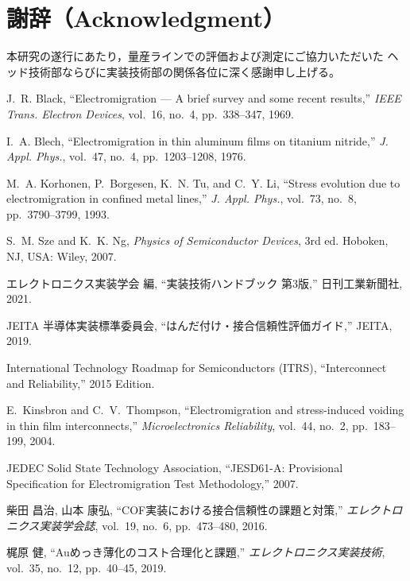 \documentclass[conference]{IEEEtran}
\begin{document}
\section*{謝辞（Acknowledgment）}
本研究の遂行にあたり，量産ラインでの評価および測定にご協力いただいた
ヘッド技術部ならびに実装技術部の関係各位に深く感謝申し上げる。

\balance

\begin{thebibliography}{99}

J.~R. Black, ``Electromigration --- A brief survey and some recent results,''
\emph{IEEE Trans. Electron Devices}, vol.~16, no.~4, pp.~338--347, 1969.

I.~A. Blech, ``Electromigration in thin aluminum films on titanium nitride,''
\emph{J. Appl. Phys.}, vol.~47, no.~4, pp.~1203--1208, 1976.

M.~A. Korhonen, P.~Borgesen, K.~N. Tu, and C.~Y. Li,
``Stress evolution due to electromigration in confined metal lines,''
\emph{J. Appl. Phys.}, vol.~73, no.~8, pp.~3790--3799, 1993.

S.~M. Sze and K.~K. Ng, \emph{Physics of Semiconductor Devices}, 3rd ed.
Hoboken, NJ, USA: Wiley, 2007.

エレクトロニクス実装学会 編, 
``実装技術ハンドブック 第3版,'' 日刊工業新聞社, 2021.

JEITA 半導体実装標準委員会, 
``はんだ付け・接合信頼性評価ガイド,'' JEITA, 2019.

International Technology Roadmap for Semiconductors (ITRS), 
``Interconnect and Reliability,'' 2015 Edition.

E.~Kinsbron and C.~V.~Thompson, 
``Electromigration and stress-induced voiding in thin film interconnects,''
\emph{Microelectronics Reliability}, vol.~44, no.~2, pp.~183--199, 2004.

JEDEC Solid State Technology Association, 
``JESD61-A: Provisional Specification for Electromigration Test Methodology,'' 2007.

柴田 昌治, 山本 康弘, 
``COF実装における接合信頼性の課題と対策,''
\emph{エレクトロニクス実装学会誌}, vol.~19, no.~6, pp.~473--480, 2016.

梶原 健, ``Auめっき薄化のコスト合理化と課題,'' 
\emph{エレクトロニクス実装技術}, vol.~35, no.~12, pp.~40--45, 2019.

\end{thebibliography}
\end{document}
